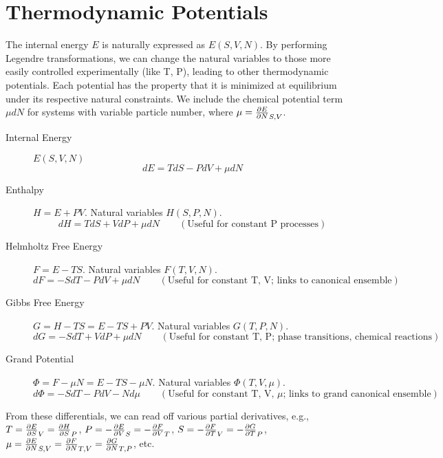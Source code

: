 \documentclass[10pt, letterpaper]{article}
\begin{document}
\section{Thermodynamic Potentials}
The internal energy $E$ is naturally expressed as $E(S, V, N)$. By performing Legendre transformations, we can change the natural variables to those more easily controlled experimentally (like T, P), leading to other thermodynamic potentials. Each potential has the property that it is minimized at equilibrium under its respective natural constraints.
We include the chemical potential term $\mu dN$ for systems with variable particle number, where $\mu = \pdv{E}{N}_{S,V}$.
\begin{description}
    \item[Internal Energy] $E(S, V, N)$
        \begin{equation*} dE = T dS - P dV + \mu dN \end{equation*}
    \item[Enthalpy] $H = E + PV$. Natural variables $H(S, P, N)$.
        \begin{equation*} dH = T dS + V dP + \mu dN \qquad (\text{Useful for constant P processes}) \end{equation*}
    \item[Helmholtz Free Energy] $F = E - TS$. Natural variables $F(T, V, N)$.
        \begin{equation*} dF = -S dT - P dV + \mu dN \qquad (\text{Useful for constant T, V; links to canonical ensemble}) \end{equation*}
    \item[Gibbs Free Energy] $G = H - TS = E - TS + PV$. Natural variables $G(T, P, N)$.
        \begin{equation*} dG = -S dT + V dP + \mu dN \qquad (\text{Useful for constant T, P; phase transitions, chemical reactions}) \end{equation*}
    \item[Grand Potential] $\Phi = F - \mu N = E - TS - \mu N$. Natural variables $\Phi(T, V, \mu)$.
        \begin{equation*} d\Phi = -S dT - P dV - N d\mu \qquad (\text{Useful for constant T, V, } \mu\text{; links to grand canonical ensemble}) \end{equation*}
\end{description}
From these differentials, we can read off various partial derivatives, e.g., $T = \pdv{E}{S}_V = \pdv{H}{S}_P$, $P = -\pdv{E}{V}_S = -\pdv{F}{V}_T$, $S = -\pdv{F}{T}_V = -\pdv{G}{T}_P$, $\mu = \pdv{E}{N}_{S,V} = \pdv{F}{N}_{T,V} = \pdv{G}{N}_{T,P}$, etc.
\end{document}
